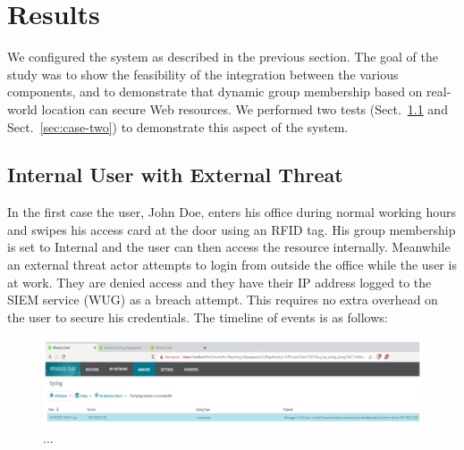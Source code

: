 \section{Results}\label{sec:results}

We configured the system as described in the previous section.  The
goal of the study was to show the feasibility of the integration
between the various components, and to demonstrate that dynamic group
membership based on real-world location can secure Web resources.  We
performed two tests (Sect.~\ref{sec:case-one} and
Sect.~\ref{sec:case-two}) to demonstrate this aspect of the system.

\subsection{Internal User with External Threat}\label{sec:case-one}

In the first case the user, John Doe, enters his office during normal
working hours and swipes his access card at the door using an RFID
tag.  His group membership is set to Internal and the user can then
access the resource internally.  Meanwhile an external threat actor
attempts to login from outside the office while the user is at work.
They are denied access and they have their IP address logged to the
SIEM service (WUG) as a breach attempt.  This requires no extra
overhead on the user to secure his credentials.  The timeline of
events is as follows:

\begin{figure}
  \centerline{\includegraphics[width=\textwidth]{img/whatsup-gold-alert}}
  \caption{...}\label{fig:whatsup-gold-alert}
\end{figure}

